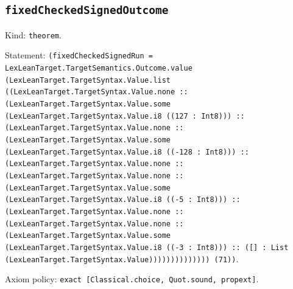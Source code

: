 \documentclass[11pt]{article}
\begin{document}
\subsection*{\texttt{fixedCheckedSignedOutcome}}
\noindent Kind: \texttt{theorem}.\par
\noindent Statement: \texttt{(fixedCheckedSignedRun = LexLeanTarget.TargetSemantics.Outcome.value (LexLeanTarget.TargetSyntax.Value.list ((LexLeanTarget.TargetSyntax.Value.none :: (LexLeanTarget.TargetSyntax.Value.some (LexLeanTarget.TargetSyntax.Value.i8 ((127 : Int8))) :: (LexLeanTarget.TargetSyntax.Value.none :: (LexLeanTarget.TargetSyntax.Value.some (LexLeanTarget.TargetSyntax.Value.i8 ((-128 : Int8))) :: (LexLeanTarget.TargetSyntax.Value.none :: (LexLeanTarget.TargetSyntax.Value.none :: (LexLeanTarget.TargetSyntax.Value.some (LexLeanTarget.TargetSyntax.Value.i8 ((-5 : Int8))) :: (LexLeanTarget.TargetSyntax.Value.none :: (LexLeanTarget.TargetSyntax.Value.none :: (LexLeanTarget.TargetSyntax.Value.some (LexLeanTarget.TargetSyntax.Value.i8 ((-3 : Int8))) :: ([] : List (LexLeanTarget.TargetSyntax.Value)))))))))))))) (71))}.\par
\noindent Axiom policy: \texttt{exact [Classical.choice, Quot.sound, propext]}.\par
\end{document}
